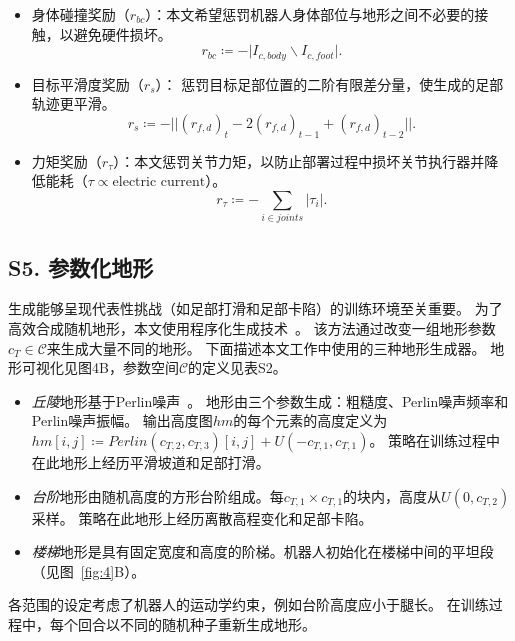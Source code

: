 \documentclass[9pt,twocolumn,twoside]{osajnl}
\begin{document}
\begin{itemize}
    \item 身体碰撞奖励（$r_{bc}$）：本文希望惩罚机器人身体部位与地形之间不必要的接触，以避免硬件损坏。
    \begin{equation}
        r_{bc} \coloneqq -\lvert I_{c, body} \backslash I_{c, foot} \rvert.
    \end{equation}

    \item 目标平滑度奖励（$r_{s}$）：
    惩罚目标足部位置的二阶有限差分量，使生成的足部轨迹更平滑。
     \begin{equation}
        r_{s} \coloneqq - \lvert\lvert
        (r_{f,d})_{t} - 2(r_{f,d})_{t-1} + (r_{f,d})_{t-2}
        \rvert\rvert .
    \end{equation}

    \item 力矩奖励（$r_{\tau}$）：本文惩罚关节力矩，以防止部署过程中损坏关节执行器并降低能耗（$\tau \propto \text{electric current}$）。
    \begin{equation}
          r_{\tau} \coloneqq - \textstyle \sum_{i\in joints} \lvert \tau_i \rvert.
    \end{equation}


\end{itemize}


\subsection*{S5. 参数化地形}
生成能够呈现代表性挑战（如足部打滑和足部卡陷）的训练环境至关重要。
为了高效合成随机地形，本文使用程序化生成技术~\cite{smelik2009survey}。
该方法通过改变一组地形参数$c_T \in \mathcal{C}$来生成大量不同的地形。
下面描述本文工作中使用的三种地形生成器。
地形可视化见图4B，参数空间$\mathcal{C}$的定义见表S2。

\begin{itemize}
  \item \textit{丘陵}地形基于Perlin噪声~\cite{lagae2010survey}。
  地形由三个参数生成：粗糙度、Perlin噪声频率和Perlin噪声振幅。
  输出高度图$hm$的每个元素的高度定义为$hm[i,j] \coloneqq Perlin (c_{T,2}, c_{T,3})[i,j] + U(-c_{T,1}, c_{T,1})$。
  策略在训练过程中在此地形上经历平滑坡道和足部打滑。

  \item \textit{台阶}地形由随机高度的方形台阶组成。每$c_{T,1} \times c_{T,1}$的块内，高度从$U(0, c_{T,2})$采样。
  策略在此地形上经历离散高程变化和足部卡陷。
  \item \textit{楼梯}地形是具有固定宽度和高度的阶梯。机器人初始化在楼梯中间的平坦段（见图~\ref{fig:4}B）。
\end{itemize}
各范围的设定考虑了机器人的运动学约束，例如台阶高度应小于腿长。
在训练过程中，每个回合以不同的随机种子重新生成地形。
\end{document}
